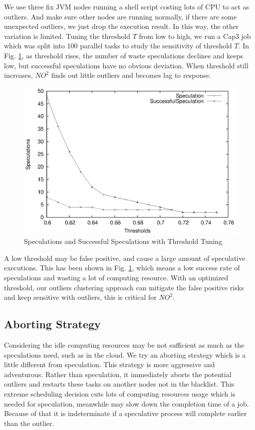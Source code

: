 We use three fix JVM nodes running a shell script costing lots of CPU to act as outliers. And make sure other nodes are running normally, if there are some unexpected outliers, we just drop the execution result. In this way, the other variation is limited. Tuning the threshold $T$ from low to high, we run a Cap3 job which was split into 100 parallel tasks to study the sensitivity of threshold $T$. In Fig. \ref{figure:thresholdtuning}, as threshold rises, the number of waste speculations declines and keeps low, but successful speculations have no obvious deviation. When threshold still increases, $NO^2$ finds out little outliers and becomes lag to response.

\begin{figure}
\centering
\includegraphics[width=0.9\columnwidth]{figures/threshold&speculation.eps}
\caption{Speculations and Successful Speculations with Threshold Tuning}
\label{figure:thresholdtuning}
\end{figure}

A low threshold may be false positive, and cause a large amount of speculative executions. This has been shown in Fig.  \ref{figure:thresholdtuning}, which means a low success rate of speculations and wasting a lot of computing resource. With an optimized threshold, our outliers clustering approach can mitigate the false positive risks and keep sensitive with outliers, this is critical for $NO^2$.

\subsection{Aborting Strategy}

Considering the idle computing resources may be not sufficient as much as the speculations need, such as in the cloud. We try an aborting strategy which is a little different from speculation. This strategy is more aggressive and adventurous. Rather than speculation, it immediately aborts the potential outliers and restarts these tasks on another nodes not in the blacklist. This extreme scheduling decision cuts lots of computing resources usage which is needed for speculation, meanwhile may slow down the completion time of a job. Because of that it is indeterminate if a speculative process will complete earlier than the outlier.

